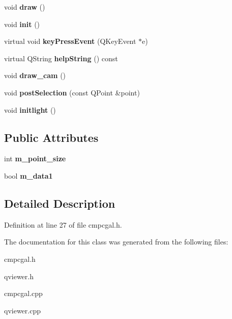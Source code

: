 \begin{DoxyCompactItemize}
\item 
\hypertarget{classViewer_a9ce9d06343c4e089ac76b19f78fe29e4}{
void {\bfseries draw} ()}
\label{classViewer_a9ce9d06343c4e089ac76b19f78fe29e4}

\item 
\hypertarget{classViewer_a255cc2d6f55fc8565e614618d41589b1}{
void {\bfseries init} ()}
\label{classViewer_a255cc2d6f55fc8565e614618d41589b1}

\item 
\hypertarget{classViewer_a9bc49dc312b1f604d443fbb8f724e104}{
virtual void {\bfseries keyPressEvent} (QKeyEvent $\ast$e)}
\label{classViewer_a9bc49dc312b1f604d443fbb8f724e104}

\item 
\hypertarget{classViewer_a5fef89556122c0438ea653a59e8bceaf}{
virtual QString {\bfseries helpString} () const }
\label{classViewer_a5fef89556122c0438ea653a59e8bceaf}

\item 
\hypertarget{classViewer_a3bc77e764106841b3c1f323cfcc01471}{
void {\bfseries draw\_\-cam} ()}
\label{classViewer_a3bc77e764106841b3c1f323cfcc01471}

\item 
\hypertarget{classViewer_aed885858645c43559de13e29ec0735a5}{
void {\bfseries postSelection} (const QPoint \&point)}
\label{classViewer_aed885858645c43559de13e29ec0735a5}

\item 
\hypertarget{classViewer_a6a4fe3649b595b303508abeb81a2ac08}{
void {\bfseries initlight} ()}
\label{classViewer_a6a4fe3649b595b303508abeb81a2ac08}

\end{DoxyCompactItemize}
\subsection*{Public Attributes}
\begin{DoxyCompactItemize}
\item 
\hypertarget{classViewer_a3441057d12edf3fe18979e01e90dbc8a}{
int {\bfseries m\_\-point\_\-size}}
\label{classViewer_a3441057d12edf3fe18979e01e90dbc8a}

\item 
\hypertarget{classViewer_a9cc31325b22c3119c4573bbfe8e5070f}{
bool {\bfseries m\_\-data1}}
\label{classViewer_a9cc31325b22c3119c4573bbfe8e5070f}

\end{DoxyCompactItemize}


\subsection{Detailed Description}


Definition at line 27 of file cmpcgal.h.



The documentation for this class was generated from the following files:\begin{DoxyCompactItemize}
\item 
cmpcgal.h\item 
qviewer.h\item 
cmpcgal.cpp\item 
qviewer.cpp\end{DoxyCompactItemize}
